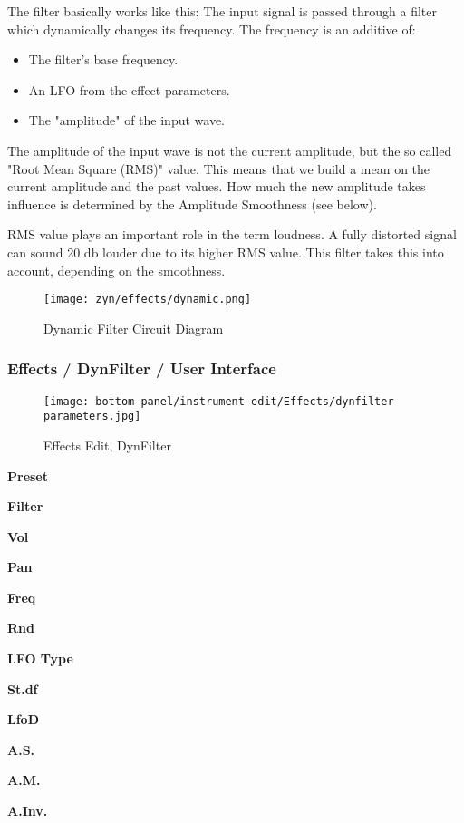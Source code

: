    The filter basically works like this: The input signal is passed through a
   filter which dynamically changes its frequency. The frequency is an
   additive of:

   \begin{itemize}
      \item The filter’s base frequency.
      \item An LFO from the effect parameters.
      \item The "amplitude" of the input wave.
   \end{itemize}

   The amplitude of the input wave is not the current amplitude, but the so
   called "Root Mean Square (RMS)" value. This means that we build a mean on
   the current amplitude and the past values. How much the new amplitude
   takes influence is determined by the Amplitude Smoothness (see below).

   RMS value plays an important role in the term loudness. A fully distorted
   signal can sound 20 db louder due to its higher RMS value. This filter
   takes this into account, depending on the smoothness.

\begin{figure}[H]
   \centering 
   \texttt{[image: zyn/effects/dynamic.png]}
   \caption{Dynamic Filter Circuit Diagram}
   \label{fig:dynfilter_circuit_diagram}
\end{figure}

\subsubsection{Effects / DynFilter / User Interface}
\label{subsubsec:effects_edit_dynfilter_ui}

\begin{figure}[H]
   \centering 
   \texttt{[image: bottom-panel/instrument-edit/Effects/dynfilter-parameters.jpg]}
   \caption{Effects Edit, DynFilter}
   \label{fig:effects_edit_dynfilter}
\end{figure}

   \begin{enumber}
      \item \textbf{Preset}
      \item \textbf{Filter}
      \item \textbf{Vol}
      \item \textbf{Pan}
      \item \textbf{Freq}
      \item \textbf{Rnd}
      \item \textbf{LFO Type}
      \item \textbf{St.df}
      \item \textbf{LfoD}
      \item \textbf{A.S.}
      \item \textbf{A.M.}
      \item \textbf{A.Inv.}
   \end{enumber}

